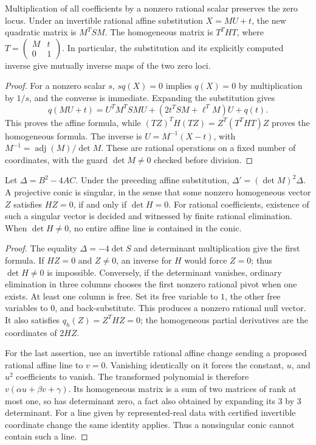 \begin{proposition}\label{con:covariance}
Multiplication of all coefficients by a nonzero rational scalar preserves
the zero locus. Under an invertible rational affine substitution $X=MU+t$,
the new quadratic matrix is $M^TSM$. The homogeneous matrix is $T^THT$, where
$T=\left(\begin{smallmatrix}M&t\\0&1\end{smallmatrix}\right)$.
In particular, the substitution and its explicitly computed inverse give
mutually inverse maps of the two zero loci.
\end{proposition}
\begin{proof}
For a nonzero scalar $s$, $sq(X)=0$ implies $q(X)=0$ by multiplication by
$1/s$, and the converse is immediate. Expanding the substitution gives
\[
 q(MU+t)=U^TM^TSMU+(2t^TSM+\ell^TM)U+q(t).
\]
This proves the affine formula, while $(TZ)^TH(TZ)=Z^T(T^THT)Z$ proves
the homogeneous formula. The inverse is $U=M^{-1}(X-t)$, with
$M^{-1}=\operatorname{adj}(M)/\det M$. These are rational operations on a
fixed number of coordinates, with the guard $\det M\ne0$ checked before
division.
\end{proof}

\begin{theorem}\label{con:invariants}
Let $\Delta=B^2-4AC$. Under the preceding affine substitution,
$\Delta'=(\det M)^2\Delta$. A projective conic is singular, in the sense
that some nonzero homogeneous vector $Z$ satisfies $HZ=0$, if and only if
$\det H=0$. For rational coefficients, existence of such a singular vector
is decided and witnessed by finite rational elimination. When $\det H\ne0$,
no entire affine line is contained in the conic.
\end{theorem}
\begin{proof}
The equality $\Delta=-4\det S$ and determinant multiplication give the
first formula. If $HZ=0$ and $Z\ne0$, an inverse for $H$ would force $Z=0$;
thus $\det H\ne0$ is impossible. Conversely, if the determinant vanishes,
ordinary elimination in three columns chooses the first nonzero rational
pivot when one exists. At least one column is free. Set its free variable
to $1$, the other free variables to $0$, and back-substitute. This produces
a nonzero rational null vector. It also satisfies $q_h(Z)=Z^THZ=0$;
the homogeneous partial derivatives are the coordinates of $2HZ$.

For the last assertion, use an invertible rational affine change sending
a proposed rational affine line to $v=0$. Vanishing identically on it
forces the constant, $u$, and $u^2$ coefficients to vanish. The transformed
polynomial is therefore $v(\alpha u+\beta v+\gamma)$. Its homogeneous
matrix is a sum of two matrices of rank at most one, so has determinant
zero, a fact also obtained by expanding its $3$ by $3$ determinant.
For a line given by represented-real data with certified invertible
coordinate change the same identity applies. Thus a nonsingular conic
cannot contain such a line.
\end{proof}

